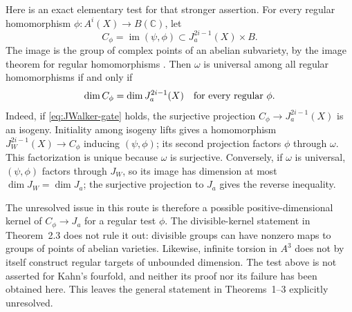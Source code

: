 Here is an exact elementary test for that stronger assertion.
For every regular homomorphism
$\phi:A^i(X)\to B(\mathbb C)$, let
\[
 C_\phi=\operatorname{im}(\psi,\phi)
       \subset J_a^{2i-1}(X)\times B.
\]
The image is the group of complex points of an abelian
subvariety, by the image theorem for regular homomorphisms
\cite[Lemma 4.7, pp.~18--19]{DGJ_ACMVFunctor}.
Then $\omega$ is universal among all regular homomorphisms
if and only if
\begin{equation}\label{eq:JWalker-gate}
 \dim C_\phi=\dim J_a^{2i-1}(X)
 \quad\hbox{for every regular }\phi.
\end{equation}
Indeed, if \eqref{eq:JWalker-gate} holds, the surjective
projection $C_\phi\to J_a^{2i-1}(X)$ is an isogeny. Initiality
among isogeny lifts gives a homomorphism
$J_W^{2i-1}(X)\to C_\phi$ inducing $(\psi,\phi)$; its second
projection factors $\phi$ through $\omega$. This factorization
is unique because $\omega$ is surjective. Conversely, if
$\omega$ is universal, $(\psi,\phi)$ factors through $J_W$,
so its image has dimension at most $\dim J_W=\dim J_a$;
the surjective projection to $J_a$ gives the reverse inequality.

The unresolved issue in this route is therefore a possible
positive-dimensional kernel of $C_\phi\to J_a$ for a regular
test $\phi$. The divisible-kernel statement in Theorem~2.3
does not rule it out: divisible groups can have nonzero maps
to groups of points of abelian varieties. Likewise, infinite
torsion in $A^3$ does not by itself construct regular targets
of unbounded dimension. The test above is not asserted for
Kahn's fourfold, and neither its proof nor its failure has
been obtained here. This leaves the general statement in
Theorems~1--3 explicitly unresolved.

